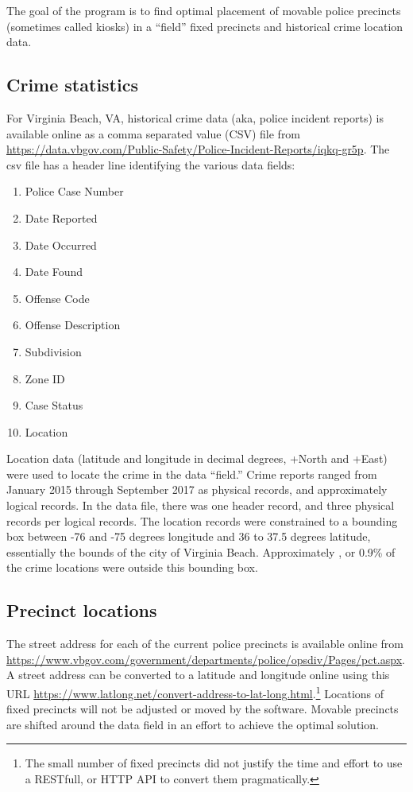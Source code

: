 The goal of the program is to find optimal placement of movable police precincts (sometimes called kiosks) in a ``field'' fixed precincts and historical crime location data.  
\subsection{Crime statistics}
For Virginia Beach, VA, historical crime data (aka, police incident reports) is available online as a comma separated value (CSV) file from \url{https://data.vbgov.com/Public-Safety/Police-Incident-Reports/iqkq-gr5p}.
The csv file has a header line identifying the various data fields:
\begin{multicols}{2}
  
\begin{enumerate}
\item Police Case Number
\item Date Reported
\item Date Occurred
\item Date Found
\item Offense Code
\item Offense Description
\item Subdivision
\item Zone ID
\item Case Status
\item Location

\end{enumerate}
\end{multicols}

Location data (latitude and longitude in decimal degrees, +North and +East) were used to locate the crime in the data ``field.''  Crime reports ranged from January 2015 through September 2017 as  physical records, and approximately  logical records.  In the data file, there was one header record, and three physical records per logical records.  The location records were constrained to a bounding box between -76 and -75 degrees longitude and 36 to 37.5 degrees latitude, essentially the bounds of the city of Virginia Beach.  Approximately , or 0.9\% of the crime locations were outside this bounding box.
\subsection{Precinct locations}
The street address for each of the current police precincts is available online from \url{https://www.vbgov.com/government/departments/police/opsdiv/Pages/pct.aspx}.  A street address can be converted to a latitude and longitude online using this URL \url{https://www.latlong.net/convert-address-to-lat-long.html}.\footnote{The small number of fixed precincts did not justify the time and effort to use a RESTfull, or HTTP API to convert them pragmatically.}  Locations of fixed precincts will not be adjusted or moved by the software.  Movable precincts are shifted around the data field in an effort to achieve the optimal solution.
